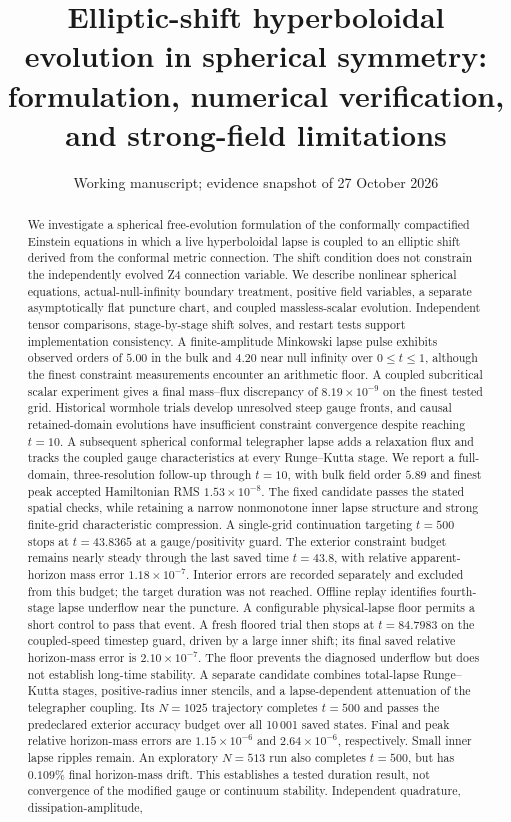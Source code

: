 \documentclass[aps,prd,reprint,floatfix,nofootinbib,longbibliography]{revtex4-2}
\begin{document}
\title{Elliptic-shift hyperboloidal evolution in spherical symmetry:
formulation, numerical verification, and strong-field limitations}
\date{Working manuscript; evidence snapshot of 27 October 2026}
\begin{abstract}
We investigate a spherical free-evolution formulation of the conformally compactified Einstein equations in which a live hyperboloidal lapse is coupled to an elliptic shift derived from the conformal metric connection. The shift condition does not constrain the independently evolved Z4 connection variable. We describe nonlinear spherical equations, actual-null-infinity boundary treatment, positive field variables, a separate asymptotically flat puncture chart, and coupled massless-scalar evolution. Independent tensor comparisons, stage-by-stage shift solves, and restart tests support implementation consistency. A finite-amplitude Minkowski lapse pulse exhibits observed orders of $5.00$ in the bulk and $4.20$ near null infinity over $0\leq t\leq1$, although the finest constraint measurements encounter an arithmetic floor. A coupled subcritical scalar experiment gives a final mass--flux discrepancy of $8.19\times10^{-9}$ on the finest tested grid. Historical wormhole trials develop unresolved steep gauge fronts, and causal retained-domain evolutions have insufficient constraint convergence despite reaching $t=10$. A subsequent spherical conformal telegrapher lapse adds a relaxation flux and tracks the coupled gauge characteristics at every Runge--Kutta stage. We report a full-domain, three-resolution follow-up through $t=10$, with bulk field order $5.89$ and finest peak accepted Hamiltonian RMS $1.53\times10^{-8}$. The fixed candidate passes the stated spatial checks, while retaining a narrow nonmonotone inner lapse structure and strong finite-grid characteristic compression. A single-grid continuation targeting $t=500$ stops at $t=43.8365$ at a gauge/positivity guard. The exterior constraint budget remains nearly steady through the last saved time $t=43.8$, with relative apparent-horizon mass error $1.18\times10^{-7}$. Interior errors are recorded separately and excluded from this budget; the target duration was not reached. Offline replay identifies fourth-stage lapse underflow near the puncture. A configurable physical-lapse floor permits a short control to pass that event. A fresh floored trial then stops at $t=84.7983$ on the coupled-speed timestep guard, driven by a large inner shift; its final saved relative horizon-mass error is $2.10\times10^{-7}$. The floor prevents the diagnosed underflow but does not establish long-time stability. A separate candidate combines total-lapse Runge--Kutta stages, positive-radius inner stencils, and a lapse-dependent attenuation of the telegrapher coupling. Its $N=1025$ trajectory completes $t=500$ and passes the predeclared exterior accuracy budget over all 10\,001 saved states. Final and peak relative horizon-mass errors are $1.15\times10^{-6}$ and $2.64\times10^{-6}$, respectively. Small inner lapse ripples remain. An exploratory $N=513$ run also completes $t=500$, but has $0.109\%$ final horizon-mass drift. This establishes a tested duration result, not convergence of the modified gauge or continuum stability. Independent quadrature, dissipation-amplitude, 
\end{abstract}
\end{document}
